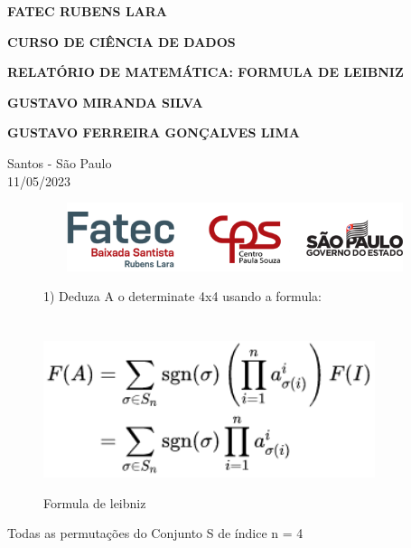 \documentclass[a4paper,12pt]{article}
\begin{document}
\begin{center}
\textbf{FATEC RUBENS LARA}

\textbf{CURSO DE CIÊNCIA DE DADOS}

\vspace{3cm}

\textbf{RELATÓRIO DE MATEMÁTICA: FORMULA DE LEIBNIZ}

\vspace{3cm}

\textbf{GUSTAVO MIRANDA SILVA}

\textbf{GUSTAVO FERREIRA GONÇALVES LIMA}

\vfill

\begin{flushright}
Santos - São Paulo\\
11/05/2023
\end{flushright}
\end{center}

\begin{figure}{}
\centering
\label{}
\includegraphics[width=14cm,height=2cm]{rodap-4.png}
\end{figure}

\clearpage



\begin{figure}
1) Deduza A o determinate 4x4 usando a formula:\\\\\\
    \centering
    \includegraphics[height=4cm]{leibniz.png}
    \caption{Formula de leibniz}
    \label{fig:my_label}
\end{figure}

Todas as permutações do Conjunto S de índice n = 4
\end{document}
